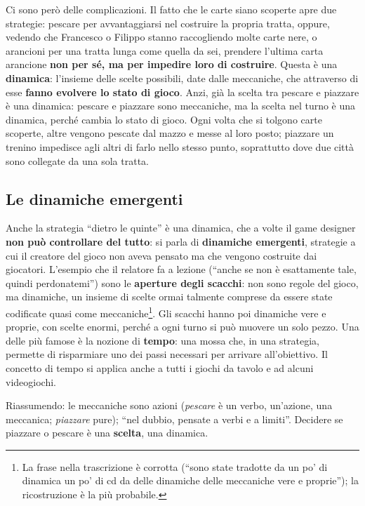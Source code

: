 Ci sono però delle complicazioni. Il fatto che le carte siano scoperte apre due
strategie: pescare per avvantaggiarsi nel costruire la propria tratta, oppure,
vedendo che Francesco o Filippo stanno raccogliendo molte carte nere, o
arancioni per una tratta lunga come quella da sei, prendere l'ultima carta
arancione \textbf{non per sé, ma per impedire loro di costruire}. Questa è una
\textbf{dinamica}: l'insieme delle scelte possibili, date dalle meccaniche, che
attraverso di esse \textbf{fanno evolvere lo stato di gioco}. Anzi, già la scelta
tra pescare e piazzare è una dinamica: pescare e piazzare sono meccaniche, ma la
scelta nel turno è una dinamica, perché cambia lo stato di gioco. Ogni volta che
si tolgono carte scoperte, altre vengono pescate dal mazzo e messe al loro posto;
piazzare un trenino impedisce agli altri di farlo nello stesso punto,
soprattutto dove due città sono collegate da una sola tratta.

\subsection{Le dinamiche emergenti}

Anche la strategia ``dietro le quinte'' è una dinamica, che a volte il game
designer \textbf{non può controllare del tutto}: si parla di \textbf{dinamiche
emergenti}, strategie a cui il creatore del gioco non aveva pensato ma che
vengono costruite dai giocatori. L'esempio che il relatore fa a lezione (``anche
se non è esattamente tale, quindi perdonatemi'') sono le \textbf{aperture degli
scacchi}: non sono regole del gioco, ma dinamiche, un insieme di scelte ormai
talmente comprese da essere state codificate quasi come
meccaniche\footnote{La frase nella trascrizione è corrotta (``sono state tradotte
da un po' di dinamica un po' di cd da delle dinamiche delle meccaniche vere e
proprie''); la ricostruzione è la più probabile.}. Gli scacchi hanno poi
dinamiche vere e proprie, con scelte enormi, perché a ogni turno si può muovere un
solo pezzo. Una delle più famose è la nozione di \textbf{tempo}: una mossa che,
in una strategia, permette di risparmiare uno dei passi necessari per arrivare
all'obiettivo. Il concetto di tempo si applica anche a tutti i giochi da tavolo e
ad alcuni videogiochi.

Riassumendo: le meccaniche sono azioni (\emph{pescare} è un verbo, un'azione,
una meccanica; \emph{piazzare} pure); ``nel dubbio, pensate a verbi e a
limiti''. Decidere se piazzare o pescare è una \textbf{scelta}, una dinamica.

